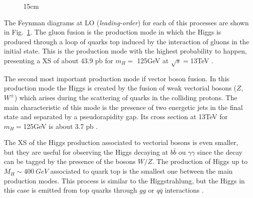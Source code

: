 \begin{figure}[htbp]{15cm}
	\label{fig:Higgs_pro_mechanisms}
\end{figure}

The Feynman diagrams at LO (\textit{leading-order}) for each of this processes are shown in Fig.~\ref{fig:Higgs_pro_mechanisms}. The gluon fusion is the production mode in which the Higgs is produced through a loop of quarks top induced by the interaction of gluons in the initial state. This is the production mode with the highest probability to happen, presenting a XS of about 43.9 pb for $m_{H} = $ 125GeV at $\sqrt{s} = $13TeV \cite{bib:LHC-Higgs-XSWG-2018}. 

The second most important production mode if vector boson fusion. In this production mode the Higgs is created by the fusion of weak vectorial bosons ($Z$, $W^{\pm}$) which arises during the scattering of quarks in the colliding protons. The main characteristic of this mode is the presence of two energetic jets in the final state and separated by a pseudorapidity gap. Its cross section at 13TeV for $m_{H} = $125GeV is about 3.7 pb \cite{bib:IFAE-14-2008,bib:LHC-Higgs-XSWG-2018}.

The XS of the Higgs production associated to vectorial bosons is even smaller, but they are useful for observing the Higgs decaying at $b\bar{b}$ ou $\gamma\gamma$ since the decay can be tagged by the presence of the bosons $W/Z$. The production of Higgs up to $M_{H} \sim 400~GeV$ associated to quark top is the smallest one between the main production modes. This process is similar to the Higgstrahlung, but the Higgs in this case is emitted from top quarks through $gg$ or $q\bar{q}$ interactions \cite{bib:ellis-2003}.

